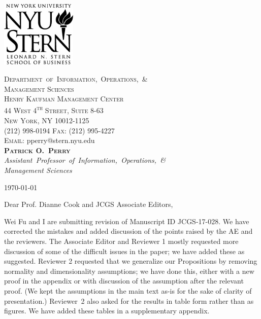 \documentclass[12pt,letterpaper]{article}
\begin{document}

\noindent
\begin{minipage}[t]{2in}
  \vspace{0pt}
  \includegraphics[width=1.42in]{logo.png}
\end{minipage}
\hfill
\begin{minipage}[t]{3in}
  \vspace{0pt}\raggedright
  {\footnotesize%
  {\scshape%
    Department~of~Information,~Operations,~\& \\
    Management Sciences \\
  }
  \vspace{\baselineskip}
  {\scshape%
    Henry Kaufman Management Center \\
    44 West 4\textsuperscript{th} Street, Suite 8-63 \\
    New York, NY 10012-1125 \\
    (212) 998-0194 \hspace{2ex} Fax: (212) 995-4227 \\
    Email:} pperry@stern.nyu.edu \\
  \vspace{\baselineskip}
  {\scshape {\bfseries Patrick O.\ Perry}} \\
  {\slshape%
    Assistant~Professor~of~Information,~Operations,~\& \\
    Management Sciences
  }
  }
\end{minipage}


\vspace{1\baselineskip}


\begin{flushright}
\today
\end{flushright}


\noindent
Dear Prof. Dianne Cook and JCGS Associate Editors,

\vspace{1\baselineskip}

Wei Fu and I are submitting revision of Manuscript ID JCGS-17-028. We have
corrected the mistakes and added discussion of the points raised by the AE and
the reviewers. The Associate Editor and Reviewer 1 mostly requested more
discussion of some of the difficult issues in the paper; we have added these
as suggested. Reviewer 2 requested that we generalize our Propositions by
removing normality and dimensionality assumptions; we have done this, either
with a new proof in the appendix or with discussion of the assumption after
the relevant proof. (We kept the assumptions in the main text as-is for the
sake of clarity of presentation.) Reviewer~2 also asked for the results in
table form rather than as figures. We have added these tables in a
supplementary appendix.
\end{document}
